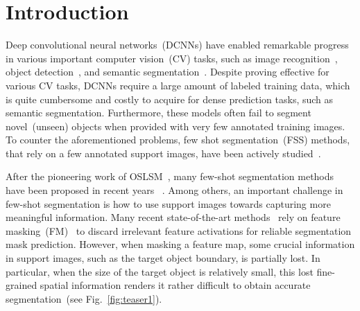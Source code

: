 \documentclass[runningheads]{llncs}
\begin{document}
\section{Introduction}
\label{sec:intro}

Deep convolutional neural networks~(DCNNs) have enabled remarkable progress in various important computer vision~(CV) tasks, such as image recognition~\cite{krizhevsky2012imagenet,Resnet,VGG16,huang2017densely}, object detection~\cite{ren2015faster,redmon2016you,liu2016ssd}, and semantic segmentation~\cite{Deeplab,fully_conv_net_seg,pyramidscene}. Despite proving effective for various CV tasks, DCNNs require a large amount of labeled training data, which is quite cumbersome and costly to acquire for dense prediction tasks, such as semantic segmentation. Furthermore, these models often fail to segment novel~(unseen) objects when provided with very few annotated training images. To counter the aforementioned problems, few shot segmentation~(FSS) methods, that rely on a few annotated support images, have been actively studied~\cite{Co-FCN,AMP-2,PMM,FWB,PANet,CANet,PFENet,DAN,RePRI,SAGNN,FSOT,Zhang2020SGOneSG,CWT,ASGNet,HSNet}.





After the pioneering work of OSLSM~\cite{OSLSM}, many few-shot segmentation methods have been proposed in recent years ~\cite{Co-FCN,AMP-2,PMM,FWB,PANet,CANet,PFENet,DAN,RePRI,SAGNN,FSOT,Zhang2020SGOneSG,CWT,ASGNet,HSNet}. Among others, an important challenge in few-shot segmentation is how to use support images towards capturing more meaningful information. Many recent state-of-the-art methods~\cite{Zhang2020SGOneSG,CANet,PFENet,PANet,yang2021mining,HSNet, VAT, ASNet} rely on feature masking~(FM)~\cite{Zhang2020SGOneSG} to discard irrelevant feature activations for reliable segmentation mask prediction. However, when masking a feature map, some crucial information in support images, such as the target object boundary, is partially lost. In particular, when the size of the target object is relatively small, this lost fine-grained spatial information renders it rather difficult to obtain accurate segmentation~(see Fig.~\ref{fig:teaser1}).
\end{document}
